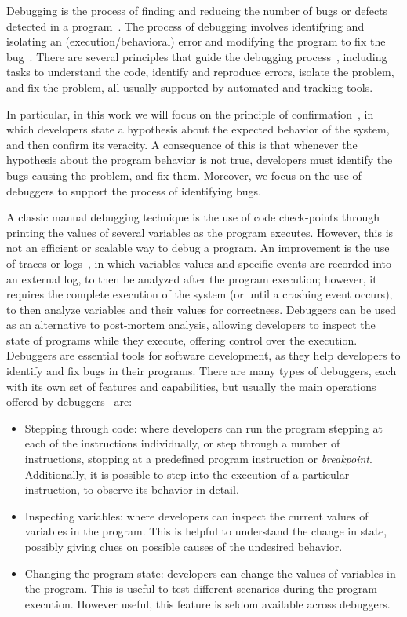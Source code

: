 Debugging is the process of finding and reducing the number of bugs or defects detected in a 
program~\cite{hindriks12}. The process of debugging involves identifying and isolating an 
(execution/behavioral) error and modifying the program to fix the bug~\cite{mccauley08}. 
There are several principles that guide the debugging 
process~\cite{telles01,zeller09,spinellis16,agans23}, including tasks to understand the code, identify and reproduce errors, isolate the problem, and fix the problem, 
all usually supported by automated and tracking tools.

In particular, in this work we will focus on the principle of confirmation~\cite{matloff08,alaboudi20}, 
in which developers state a hypothesis about the expected behavior of the system, and then confirm 
its veracity. A consequence of this is that whenever the hypothesis 
about the program behavior is not true, developers must identify the bugs causing the problem, 
and fix them. Moreover, we focus on the use of debuggers to support the process of identifying bugs.

A classic manual debugging technique is the use of code check-points through printing the values of 
several variables as the program executes. However, this is not an efficient or scalable way to 
debug a program. 
An improvement is the use of traces or logs~\cite{yin20}, in which variables values and 
specific events are recorded into an external log, to then be analyzed after the program execution; 
however, it requires the complete execution of the system (or until a crashing event 
occurs), to then analyze  variables and their values for correctness.
Debuggers can be used as an alternative to post-mortem analysis, allowing developers to inspect the 
state of programs while they execute, offering control over the execution. Debuggers are essential 
tools for software development, as they help developers to identify and fix bugs in their programs. 
There are many types of debuggers, each with its own set of features and capabilities, but usually 
the main operations offered by debuggers~\cite{matloff08} are:

\begin{itemize}
    \item Stepping through code: where developers can run the program stepping at each of the 
    instructions individually, or step through a number of instructions, stopping at a predefined program 
    instruction or  \emph{breakpoint}. Additionally, it is possible to step into the execution of a particular 
    instruction, to observe its behavior in detail. 
    \item Inspecting variables: where developers can inspect the current values of variables in the 
    program. This is helpful to understand the change in state, possibly giving clues on possible causes 
    of the undesired behavior.
    \item Changing the program state: developers can change the values of variables in the program. 
    This is useful to test different scenarios during the program execution. However useful, this feature 
    is seldom available across debuggers.
\end{itemize}



